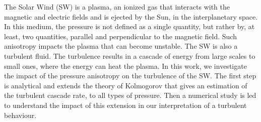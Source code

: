 	The Solar Wind (SW) is a plasma, an ionized gas that interacts with the magnetic and electric fields and is ejected by the Sun, in the interplanetary space. In this medium, the pressure is not defined as a single quantity, but rather by, at least, two quantities, parallel and perpendicular to the magnetic field. Such anisotropy impacts the plasma that can become unstable. The SW is also a turbulent fluid. The turbulence results in a cascade of energy from large scales to small ones, where the energy can heat the plasma. In this work, we investigate the impact of the pressure anisotropy on the turbulence of the SW. The first step is analytical and extends the theory of Kolmogorov that gives an estimation of the turbulent cascade rate, to all types of pressure. Then a numerical study is led to understand the impact of this extension in our interpretation of a turbulent behaviour.